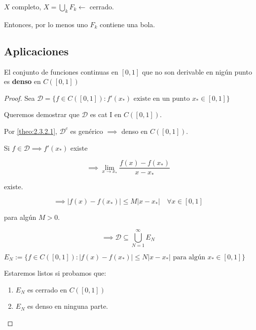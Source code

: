 \begin{fcorollary}
    $X$ completo, $X=\bigcup_k F_k\leftarrow$ cerrado.

    Entonces, por lo menos uno $F_k$ contiene una bola.
\end{fcorollary}

\subsection{Aplicaciones}

\begin{ftheorem}
    El conjunto de funciones continuas en $[0,1]$ que no son derivable en nigún punto es \textbf{denso} en $C([0,1])$
\end{ftheorem}

\begin{proof}
    Sea $\mathcal{D}=\{f\in C([0,1]):f'(x_*) \text{ existe en un punto } x_*\in [0,1]\}$

    Queremos demostrar que $\mathcal{D}$ es cat I en $C([0,1])$.

    Por \ref{theo:2.3.2.1}, $\mathcal{D}^c$ es genérico $\implies$ denso en $C([0,1])$.

    Si $f\in \mathcal{D}\implies f'(x_*)$ existe

    \[\implies \lim_{x\to x_*} \frac{f(x)-f(x_*)}{x-x_*}\]

    existe.

    \[\implies |f(x)-f(x_*)|\leq M|x-x_*|\quad \forall x\in [0,1]\]

    para algún $M>0$.

    \[\implies \mathcal{D}\subseteq \bigcup_{N=1}^\infty E_N\]

    $E_N:=\{f\in C([0,1]):|f(x)-f(x_*)|\leq N|x-x_*|\text{ para algún $x_*\in[0,1]$}\}$

    Estaremos listos si probamos que:

    \begin{enumerate}
        \item $E_N$ es cerrado en $C([0,1])$
        \item $E_N$ es denso en ninguna parte.
    \end{enumerate}
\end{proof}